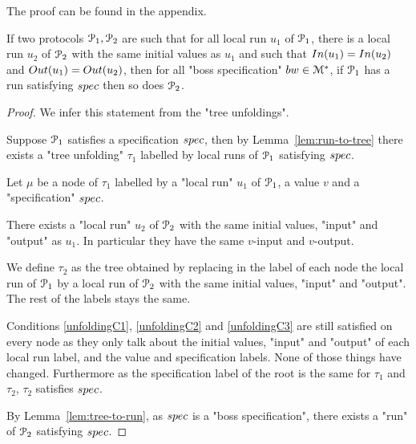 The proof can be found in the appendix.


\begin{lemma}
	\label{lem:local-to-global}
	If two protocols $\mathcal{P}_1, \mathcal{P}_2$ are such that for all local run $u_1$ of $\mathcal{P}_1$, there is a local run $u_2$ of $\mathcal{P}_2$ with the same initial values as $u_1$ and such that $\Input{u_1} = \Input{u_2}$ and $\Output{u_1} = \Output{u_2}$, then for all "boss specification" $bw \in \mathcal{M}^*$, if $\mathcal{P}_1$ has a run satisfying $spec$ then so does $\mathcal{P}_2$.
\end{lemma}
\ifproofs
\begin{proof}
	We infer this statement from the "tree unfoldings".
	
	Suppose $\mathcal{P}_1$ satisfies a specification $spec$, then by Lemma~\ref{lem:run-to-tree} there exists a "tree unfolding" $\tau_1$ labelled by local runs of $\mathcal{P}_1$ satisfying $spec$. 
	
	Let $\mu$ be a node of $\tau_1$ labelled by a "local run" $u_1$ of $\mathcal{P}_1$, a value $v$ and a "specification" $spec$.  
	
	There exists a "local run" $u_2$ of $\mathcal{P}_2$ with the same initial values, "input" and "output" as $u_1$. In particular they have the same $v$-input and $v$-output.
	
	We define $\tau_2$ as the tree obtained by replacing in the label of each node the local run of $\mathcal{P}_1$ by a local run of $\mathcal{P}_2$ with the same initial values, "input" and "output". The rest of the labels stays the same.
	
	Conditions \ref{unfoldingC1}, \ref{unfoldingC2} and \ref{unfoldingC3} are still satisfied on every node as they only talk about the initial values, "input" and "output" of each local run label, and the value and specification labels. None of those things have changed.
	Furthermore as the specification label of the root is the same for $\tau_1$ and $\tau_2$, $\tau_2$ satisfies $spec$.
	
	By Lemma~\ref{lem:tree-to-run}, as $spec$ is a "boss specification", there exists a "run" of $\mathcal{P}_2$ satisfying $spec$.
\end{proof}
\fi


